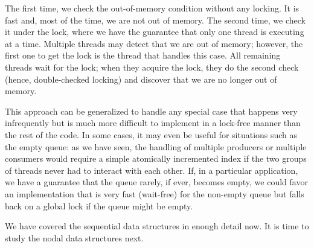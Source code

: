 The first time, we check the out-of-memory condition without any locking. It is fast and, most of the time, we are not out of memory. The second time, we check it under the lock, where we have the guarantee that only one thread is executing at a time. Multiple threads may detect that we are out of memory; however, the first one to get the lock is the thread that handles this case. All remaining threads wait for the lock; when they acquire the lock, they do the second check (hence, double-checked locking) and discover that we are no longer out of memory. 

This approach can be generalized to handle any special case that happens very infrequently but is much more difficult to implement in a lock-free manner than the rest of the code. In some cases, it may even be useful for situations such as the empty queue: as we have seen, the handling of multiple producers or multiple consumers would require a simple atomically incremented index if the two groups of threads never had to interact with each other. If, in a particular application, we have a guarantee that the queue rarely, if ever, becomes empty, we could favor an implementation that is very fast (wait-free) for the non-empty queue but falls back on a global lock if the queue might be empty.

We have covered the sequential data structures in enough detail now. It is time to study the nodal data structures next. 






























